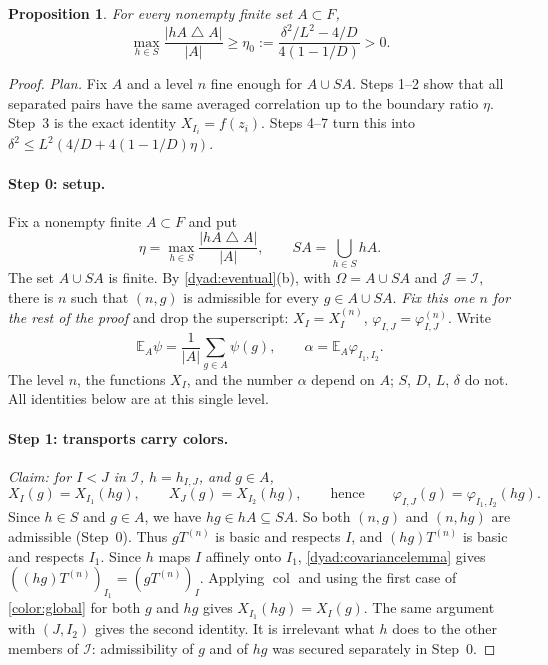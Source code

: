 \documentclass[11pt]{article}
\DeclareMathOperator{\colr}{col}
\newtheorem{proposition}[theorem]{Proposition}
\theoremstyle{definition}
\numberwithin{equation}{section}
\begin{document}
\begin{proposition}\label{avg:boundary}
For every nonempty finite set \(A\subset F\),
\begin{equation}\label{avg:boundary-bound}
  \max_{h\in S}\frac{|hA\mathbin{\triangle}A|}{|A|}
  \geq \eta_0:=\frac{\delta^2/L^2-4/D}{4(1-1/D)}>0.
\end{equation}
\end{proposition}

\begin{proof}
\emph{Plan.} Fix \(A\) and a level \(n\) fine enough for \(A\cup SA\). Steps
1--2 show that all separated pairs have the same averaged correlation up to
the boundary ratio \(\eta\). Step~3 is the exact identity
\(X_{I_i}=f(z_i)\). Steps 4--7 turn this into
\(\delta^2\le L^2(4/D+4(1-1/D)\eta)\).

\paragraph{Step 0: setup.}
Fix a nonempty finite \(A\subset F\) and put
\begin{equation}\label{avg:defect}
  \eta=\max_{h\in S}\frac{|hA\mathbin{\triangle}A|}{|A|},
  \qquad SA=\bigcup_{h\in S}hA .
\end{equation}
The set \(A\cup SA\) is finite. By \cref{dyad:eventual}(b), with
\(\Omega=A\cup SA\) and \(\mathcal J=\mathcal I\), there is \(n\) such that
\((n,g)\) is admissible for every \(g\in A\cup SA\). \emph{Fix this one \(n\)
for the rest of the proof} and drop the superscript:
\(X_I=X_I^{(n)}\), \(\varphi_{I,J}=\varphi_{I,J}^{(n)}\). Write
\[
  \mathbb E_A\psi=\frac1{|A|}\sum_{g\in A}\psi(g),
  \qquad
  \alpha=\mathbb E_A\varphi_{I_1,I_2}.
\]
The level \(n\), the functions \(X_I\), and the number \(\alpha\) depend on
\(A\); \(S\), \(D\), \(L\), \(\delta\) do not. All identities below are at
this single level.

\paragraph{Step 1: transports carry colors.}
\emph{Claim: for \(I<J\) in \(\mathcal I\), \(h=h_{I,J}\), and \(g\in A\),}
\[
  X_I(g)=X_{I_1}(hg),\qquad
  X_J(g)=X_{I_2}(hg),\qquad\text{hence}\qquad
  \varphi_{I,J}(g)=\varphi_{I_1,I_2}(hg).
\]
Since \(h\in S\) and \(g\in A\), we have \(hg\in hA\subseteq SA\). So both
\((n,g)\) and \((n,hg)\) are admissible (Step~0). Thus
\(gT^{(n)}\) is basic and respects \(I\), and \((hg)T^{(n)}\) is basic and
respects \(I_1\). Since \(h\) maps \(I\) affinely onto \(I_1\),
\cref{dyad:covariancelemma} gives
\(((hg)T^{(n)})_{I_1}=(gT^{(n)})_I\). Applying \(\colr\) and using the first
case of \eqref{color:global} for both \(g\) and \(hg\) gives
\(X_{I_1}(hg)=X_I(g)\). The same argument with \((J,I_2)\) gives the second
identity. It is irrelevant what \(h\) does to the other members of
\(\mathcal I\): admissibility of \(g\) and of \(hg\) was secured separately in
Step~0.


\end{proof}
\end{document}
